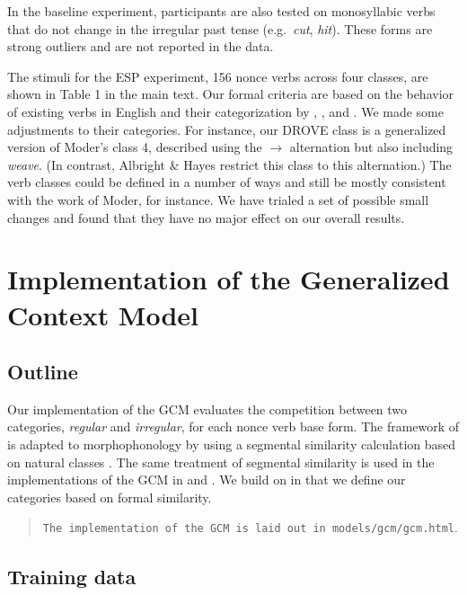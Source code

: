 \documentclass[12pt]{article}
\begin{document}
In the baseline experiment, participants are also tested on monosyllabic verbs that do not change in the irregular past tense (e.g.\ {\em cut}, {\em hit}). These forms are strong outliers and are not reported in the data.

The stimuli for the ESP experiment, 156 nonce verbs across four classes, are shown in Table 1 in the main text. Our formal criteria are based on the behavior of existing verbs in English and their categorization by \cite{bybee1982rules}, \cite{moder1992productivity}, and \cite{albright2003rules}. We made some adjustments to their categories. For instance, our DROVE class is a generalized version of Moder's class 4, described using the \textipa{[aI]}$\rightarrow{}$\textipa{[oU]} alternation but also including {\em weave}. (In contrast, Albright \& Hayes restrict this class to this alternation.) The verb classes could be defined in a number of ways and still be mostly consistent with the work of Moder, for instance. We have trialed a set of possible small changes and found that they have no major effect on our overall results.


\section{Implementation of the Generalized Context Model\label{appendixgcm}}

\subsection{Outline}

Our implementation of the GCM evaluates the competition between two categories, {\em regular} and {\em irregular}, for each nonce verb base form. The framework of \cite{nosofsky1990relations} is adapted to morphophonology by using a segmental similarity calculation based on natural classes \citep{frisch1997similarity}. The same treatment of segmental similarity is used in the implementations of the GCM in \cite{albright2003rules} and \cite{dawdy2014learnability}. We build on \cite{dawdy2014learnability} in that we define our categories based on formal similarity. 

\begin{quote}
 \texttt{The implementation of the GCM is laid out in models/gcm/gcm.html}.
\end{quote}

\subsection{Training data}
\end{document}
